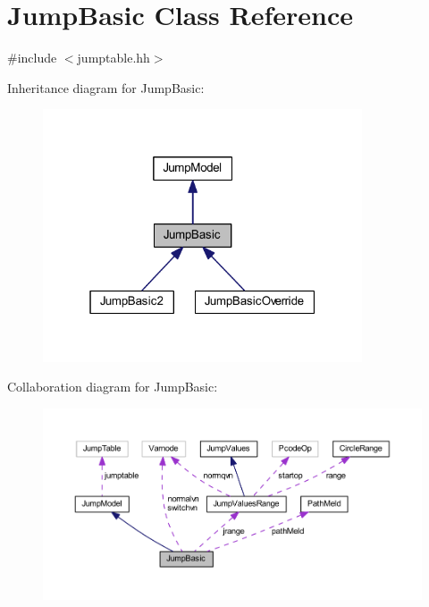 \hypertarget{class_jump_basic}{}\section{Jump\+Basic Class Reference}
\label{class_jump_basic}


{\ttfamily \#include $<$jumptable.\+hh$>$}



Inheritance diagram for Jump\+Basic\+:
\nopagebreak
\begin{figure}[H]
\begin{center}
\leavevmode
\includegraphics[width=268pt]{class_jump_basic__inherit__graph}
\end{center}
\end{figure}


Collaboration diagram for Jump\+Basic\+:
\nopagebreak
\begin{figure}[H]
\begin{center}
\leavevmode
\includegraphics[width=350pt]{class_jump_basic__coll__graph}
\end{center}
\end{figure}
